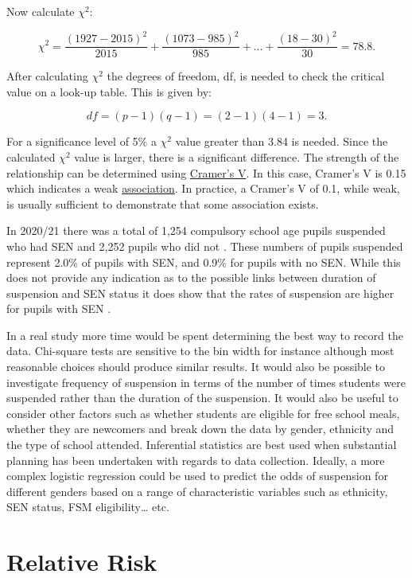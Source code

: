 \documentclass[
]{book}
\begin{document}
Now calculate \(\chi^2\):

\[\chi^2=\frac{(1927-2015)^2}{2015} +\frac{(1073-985)^2}{985}+... + \frac{(18-30)^2}{30} = 78.8.\]

After calculating \(\chi^2\) the degrees of freedom, df, is needed to check the critical value on a look-up table. This is given by:

\[df=(p-1)(q-1)=(2-1)(4-1)=3.\]

For a significance level of 5\% a \(\chi^2\) value greater than 3.84 is needed. Since the calculated \(\chi^2\) value is larger, there is a significant difference. The strength of the relationship can be determined using \protect\hyperlink{cramer}{Cramer's V}. In this case, Cramer's V is 0.15 which indicates a weak \protect\hyperlink{association}{association}. In practice, a Cramer's V of 0.1, while weak, is usually sufficient to demonstrate that some association exists.

In 2020/21 there was a total of 1,254 compulsory school age pupils suspended who had SEN and 2,252 pupils who did not \citep{nisra11}. These numbers of pupils suspended represent 2.0\% of pupils with SEN, and 0.9\% for pupils with no SEN. While this does not provide any indication as to the possible links between duration of suspension and SEN status it does show that the rates of suspension are higher for pupils with SEN \citep{nisra11}.

In a real study more time would be spent determining the best way to record the data. Chi-square tests are sensitive to the bin width for instance although most reasonable choices should produce similar results. It would also be possible to investigate frequency of suspension in terms of the number of times students were suspended rather than the duration of the suspension. It would also be useful to consider other factors such as whether students are eligible for free school meals, whether they are newcomers and break down the data by gender, ethnicity and the type of school attended. Inferential statistics are best used when substantial planning has been undertaken with regards to data collection. Ideally, a more complex logistic regression could be used to predict the odds of suspension for different genders based on a range of characteristic variables such as ethnicity, SEN status, FSM eligibility\ldots{} etc.

\hypertarget{relative-risk}{%
\section{Relative Risk}\label{relative-risk}}
\end{document}
